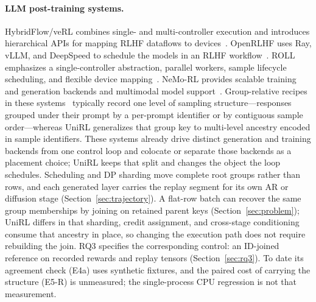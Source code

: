 \documentclass[10pt]{article}
\begin{document}
\paragraph{LLM post-training systems.}
HybridFlow/veRL combines single- and multi-controller execution and introduces hierarchical APIs for mapping RLHF dataflows to devices~\citep{sheng2024hybridflow}.
OpenRLHF uses Ray, vLLM, and DeepSpeed to schedule the models in an RLHF workflow~\citep{hu2024openrlhf}.
ROLL emphasizes a single-controller abstraction, parallel workers, sample lifecycle scheduling, and flexible device mapping~\citep{wang2025roll}.
NeMo-RL provides scalable training and generation backends and multimodal model support~\citep{nemorl2025}.
Group-relative recipes in these systems~\citep{sheng2024hybridflow,hu2024openrlhf,wang2025roll,nemorl2025} typically record one level of sampling structure---responses grouped under their prompt by a per-prompt identifier or by contiguous sample order---whereas UniRL generalizes that group key to multi-level ancestry encoded in sample identifiers.
These systems already drive distinct generation and training backends from one control loop and colocate or separate those backends as a placement choice; UniRL keeps that split and changes the object the loop schedules.
Scheduling and DP sharding move complete root groups rather than rows, and each generated layer carries the replay segment for its own AR or diffusion stage (Section~\ref{sec:trajectory}).
A flat-row batch can recover the same group memberships by joining on retained parent keys (Section~\ref{sec:problem}); UniRL differs in that sharding, credit assignment, and cross-stage conditioning consume that ancestry in place, so changing the execution path does not require rebuilding the join.
RQ3 specifies the corresponding control: an ID-joined reference on recorded rewards and replay tensors (Section~\ref{sec:rq3}).
To date its agreement check (E4a) uses synthetic fixtures, and the paired cost of carrying the structure (E5-R) is unmeasured; the single-process CPU regression is not that measurement.
\end{document}
